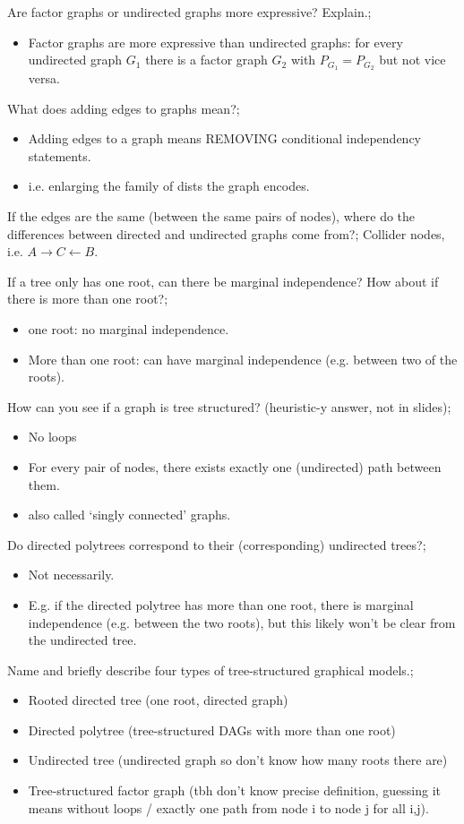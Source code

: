 \documentclass{article}
\begin{document}
Are factor graphs or undirected graphs more expressive? Explain.; \begin{itemize}
    \item Factor graphs are more expressive than undirected graphs: for every undirected graph $G_1$ there is a factor graph $G_2$ with $P_{G_1}=P_{G_2}$ but not vice versa.
\end{itemize}

What does adding edges to graphs mean?; \begin{itemize}
    \item Adding edges to a graph means REMOVING conditional independency statements.
    \item i.e. enlarging the family of dists the graph encodes.
\end{itemize}

If the edges are the same (between the same pairs of nodes), where do the differences between directed and undirected graphs come from?; Collider nodes, i.e. $A\rightarrow C \leftarrow B$.

If a tree only has one root, can there be marginal independence? How about if there is more than one root?; \begin{itemize}
    \item one root: no marginal independence.
    \item More than one root: can have marginal independence (e.g. between two of the roots).
\end{itemize}

How can you see if a graph is tree structured? (heuristic-y answer, not in slides); \begin{itemize}
    \item No loops
    \item For every pair of nodes, there exists exactly one (undirected) path between them.
    \item also called `singly connected' graphs.
\end{itemize}

Do directed polytrees correspond to their (corresponding) undirected trees?; \begin{itemize}
    \item Not necessarily. 
    \item E.g. if the directed polytree has more than one root, there is marginal independence (e.g. between the two roots), but this likely won't be clear from the undirected tree.
\end{itemize}

Name and briefly describe four types of tree-structured graphical models.; \begin{itemize}
    \item Rooted directed tree (one root, directed graph)
    \item Directed polytree (tree-structured DAGs with more than one root)
    \item Undirected tree (undirected graph so don't know how many roots there are)
    \item Tree-structured factor graph (tbh don't know precise definition, guessing it means without loops / exactly one path from node i to node j for all i,j).
\end{itemize}
\end{document}
